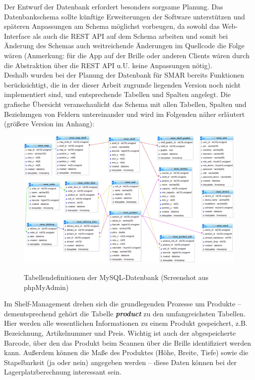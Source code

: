 Der Entwurf der Datenbank erfordert besonders sorgsame Planung. Das Datenbankschema sollte künftige Erweiterungen der Software unterstützen und späteren Anpassungen am Schema möglichst vorbeugen, da sowohl das Web-Interface als auch die \acs{REST} \acs{API} auf dem Schema arbeiten und somit bei Änderung des Schemas auch weitreichende Änderungen im Quellcode die Folge wären (Anmerkung: für die App auf der Brille oder anderen Clients wären durch die Abstraktion über die \acs{REST} \acs{API} u.U. keine Anpassungen nötig).\\
Deshalb wurden bei der Planung der Datenbank für SMAR bereits Funktionen berücksichtigt, die in der dieser Arbeit zugrunde liegenden Version noch nicht implementiert sind, und entsprechende Tabellen und Spalten angelegt. Die grafische Übersicht veranschaulicht das Schema mit allen Tabellen, Spalten und Beziehungen von Feldern untereinander und wird im Folgenden näher erläutert (größere Version im Anhang):

\begin{figure}[H]
	\centering
	{\includegraphics[width=\textwidth]{Bilder/Abbildungen/architektur_datenbankschema.png}}
	\caption{Tabellendefinitionen der MySQL-Datenbank (Screenshot aus phpMyAdmin)}
	\label{fig:architektur_datenbankschema}
\end{figure}

Im Shelf-Management drehen sich die grundlegenden Prozesse um Produkte -- dementsprechend gehört die Tabelle \textit{\textbf{product}} zu den umfangreichsten Tabellen. Hier werden alle wesentlichen Informationen zu einem Produkt gespeichert, z.B. Bezeichnung, Artikelnummer und Preis. Wichtig ist auch der abgespeicherte Barcode, über den das Produkt beim Scannen über die Brille identifiziert werden kann. Außerdem können die Maße des Produktes (Höhe, Breite, Tiefe) sowie die Stapelbarkeit (ja oder nein) angegeben werden -- diese Daten können bei der Lagerplatzberechnung interessant sein.\\

